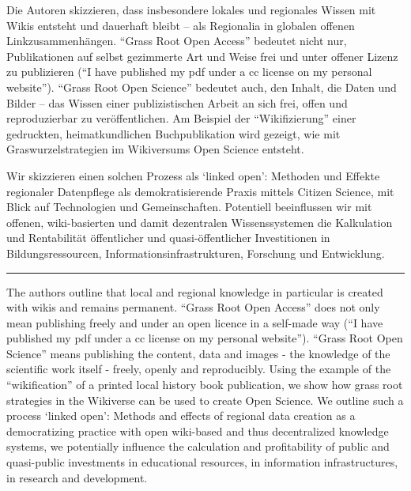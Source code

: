 Die Autoren skizzieren, dass insbesondere lokales und regionales Wissen
mit Wikis entsteht und dauerhaft bleibt -- als Regionalia in globalen
offenen Linkzusammenhängen. ``Grass Root Open Access'' bedeutet nicht
nur, Publikationen auf selbst gezimmerte Art und Weise frei und unter
offener Lizenz zu publizieren (``I have published my pdf under a cc
license on my personal website''). ``Grass Root Open Science'' bedeutet
auch, den Inhalt, die Daten und Bilder -- das Wissen einer
publizistischen Arbeit an sich frei, offen und reproduzierbar zu
veröffentlichen. Am Beispiel der ``Wikifizierung'' einer gedruckten,
heimatkundlichen Buchpublikation wird gezeigt, wie mit
Graswurzelstrategien im Wikiversums Open Science entsteht.

Wir skizzieren einen solchen Prozess als `linked open': Methoden und
Effekte regionaler Datenpflege als demokratisierende Praxis mittels
Citizen Science, mit Blick auf Technologien und Gemeinschaften.
Potentiell beeinflussen wir mit offenen, wiki-basierten und damit
dezentralen Wissenssystemen die Kalkulation und Rentabilität
öffentlicher und quasi-öffentlicher Investitionen in Bildungsressourcen,
Informationsinfrastrukturen, Forschung und Entwicklung.

\begin{center}\rule{0.5\linewidth}{0.5pt}\end{center}

The authors outline that local and regional knowledge in particular is
created with wikis and remains permanent. ``Grass Root Open Access''
does not only mean publishing freely and under an open licence in a
self-made way (``I have published my pdf under a cc license on my
personal website''). ``Grass Root Open Science'' means publishing the
content, data and images - the knowledge of the scientific work itself -
freely, openly and reproducibly. Using the example of the
``wikification'' of a printed local history book publication, we show
how grass root strategies in the Wikiverse can be used to create Open
Science. We outline such a process `linked open': Methods and effects of
regional data creation as a democratizing practice with open wiki-based
and thus decentralized knowledge systems, we potentially influence the
calculation and profitability of public and quasi-public investments in
educational resources, in information infrastructures, in research and
development.
